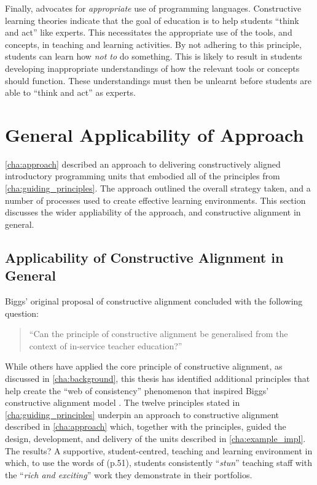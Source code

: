 Finally,  advocates for \emph{appropriate} use of programming languages. Constructive learning theories indicate that the goal of education is to help students ``think and act'' like experts. This necessitates the appropriate use of the tools, and concepts, in teaching and learning activities. By not adhering to this principle, students can learn how \emph{not to} do something. This is likely to result in students developing inappropriate understandings of how the relevant tools or concepts should function. These understandings must then be unlearnt before students are able to ``think and act'' as experts.


\section{General Applicability of Approach} %
\label{sec:approach_in_review}

\cref{cha:approach} described an approach to delivering constructively aligned introductory programming units that embodied all of the principles from \cref{cha:guiding_principles}. The approach outlined the overall strategy taken, and a number of processes used to create effective learning environments. This section discusses the wider appliability of the approach, and constructive alignment in general.

\subsection{Applicability of Constructive Alignment in General} %
\label{sub:principles_underlying_constructive_alignment}

Biggs' original proposal of constructive alignment concluded with the following question:

\begin{quote}
	``Can the principle of constructive alignment be generalised from the context of in-service teacher education?'' \citet{Biggs:1996c}
\end{quote}

While others have applied the core principle of constructive alignment, as discussed in \cref{cha:background}, this thesis has identified additional principles that help create the ``web of consistency'' phenomenon that inspired Biggs' constructive alignment model \citep{Biggs:1996c,Biggs:1999}. The twelve principles stated in \cref{cha:guiding_principles} underpin an approach to constructive alignment described in \cref{cha:approach} which, together with the principles, guided the design, development, and delivery of the units described in \cref{cha:example_impl}. The results? A supportive, student-centred, teaching and learning environment in which, to use the words of \citet{Biggs:2007} (p.51), students consistently ``\emph{stun}'' teaching staff with the ``\emph{rich and exciting}'' work they demonstrate in their portfolios.

